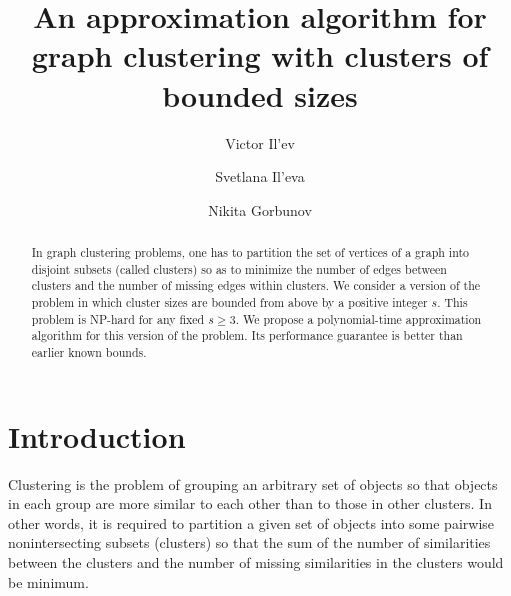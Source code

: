 \documentclass[runningheads]{llncs}
\begin{document}



\title{An approximation algorithm for graph clustering with clusters of bounded sizes}

\author{
	Victor Il'ev        \and
	Svetlana Il'eva       \and
	Nikita Gorbunov
}



\maketitle

\begin{abstract} 
In graph clustering problems, one has to partition the set of vertices 
of a graph into disjoint subsets (called clusters) so as to minimize 
the number of edges between clusters and the number of missing edges 
within clusters. 
We consider a version of the problem in which cluster sizes 
are bounded from above by a positive integer $s$.
This problem is NP-hard for any fixed $s \geqslant 3$. We propose a 
polynomial-time approximation algorithm for this version of the problem. 
Its performance guarantee is better than earlier known bounds. 


\end{abstract}



\section*{Introduction} 

Clustering is the problem of grouping an arbitrary
set of objects so that objects in each group 
are more similar to each other than to those in other clusters.
In other words, it is required to partition a given
set of objects into some pairwise nonintersecting
subsets (clusters) so that the sum of the number of similarities
between the clusters and the number of missing similarities
in the clusters would be minimum.
\end{document}
